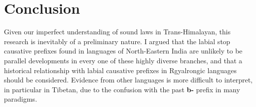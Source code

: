 \documentclass[oneside,a4paper,11pt]{article}
\newcommand{\ipa}[1]{\textbf{{\phon\mbox{#1}}}} %
\newcommand{\forme}[2]{\ipa{#1} `#2'}
\begin{document}
%
%
%


 \section{Conclusion}
Given our imperfect understanding of sound laws in Trans-Himalayan, this research is inevitably of a preliminary nature. I argued that the labial stop causative prefixes found in languages of North-Eastern India are unlikely to be parallel developments in every one of these highly diverse branches, and that a historical relationship with labial causative prefixes in Rgyalrongic languages should be considered. Evidence from other languages is more difficult to interpret, in particular in Tibetan, due to the confusion with the past \ipa{b-} prefix in many paradigms. %
\end{document}

